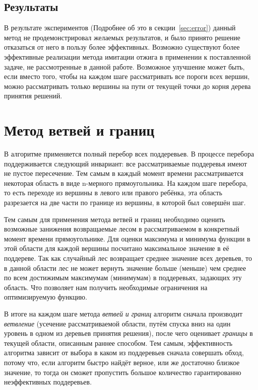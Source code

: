 \subsection{Результаты}

В результате экспериментов (Подробнее об это в секции~\ref{sec:error}) данный
метод не продемонстрировал желаемых результатов, и было принято решение
отказаться от него в пользу более эффективных. Возможно существуют более
эффективные реализации метода имитации отжига в применении к поставленной
задаче, не рассмотренные в данной работе. Возможное улучшение может быть, если
вместо того, чтобы на каждом шаге рассматривать все пороги всех вершин, можно
рассматривать только вершины на пути от текущей точки до корня дерева принятия
решений.

\section{Метод ветвей и границ}\label{sec:heu}

В алгоритме применяется полный перебор всех поддеревьев. В процессе перебора
поддерживается следующий инвариант: все рассматриваемые поддеревья имеют не
пустое пересечение. Тем самым в каждый момент времени рассматривается некоторая
область в виде n-мерного прямоугольника. На каждом шаге перебора, то есть
переходе из вершины в левого или правого ребёнка, эта область разрезается на две
части по границе из вершины, в которой был совершён шаг.

Тем самым для применения метода ветвей и границ необходимо оценить возможные
занижения возвращаемые лесом в рассматриваемом в конкретный момент времени
прямоугольнике. Для оценки максимума и минимума функции в этой области для
каждой вершины посчитано максимальное значение в её поддереве. Так как случайный
лес возвращает среднее значение всех деревьев, то в данной области лес не может
вернуть значение больше (меньше) чем среднее по всем достижимым максимумам
(минимумам) в поддеревьях, задающих эту область. Что позволяет нам получить
необходимые ограничения на оптимизируемую функцию.

В итоге на каждом шаге метода \emph{ветвей и границ} алгоритм сначала производит
\emph{ветвление} (усечение рассматриваемой области, путём спуска вниз на один
уровень в одном из деревьев принятия решения), после чего оценивает
\emph{границы} в текущей области, описанным раннее способом. Тем самым,
эффективность алгоритма зависит от выбора в каком из поддеревьев сначала
совершать обход, потому что, если алгоритм быстро найдёт верное, или же
достаточно близкое значение, то тогда он сможет пропустить большое количество
гарантированно неэффективных поддеревьев.

